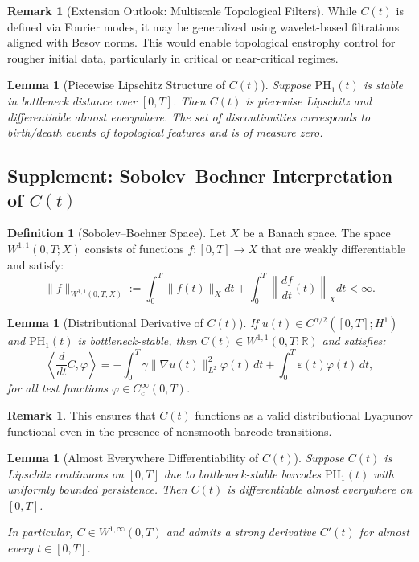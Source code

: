 \documentclass[11pt]{article}
\newtheorem{lemma}[theorem]{Lemma}
\theoremstyle{definition}
\newtheorem{definition}[theorem]{Definition}
\newtheorem{remark}[theorem]{Remark}
\begin{document}
\begin{remark}[Extension Outlook: Multiscale Topological Filters]
While $C(t)$ is defined via Fourier modes, it may be generalized using wavelet-based filtrations aligned with Besov norms. This would enable topological enstrophy control for rougher initial data, particularly in critical or near-critical regimes.
\end{remark}

\begin{lemma}[Piecewise Lipschitz Structure of $C(t)$]
Suppose $\mathrm{PH}_1(t)$ is stable in bottleneck distance over $[0,T]$. Then $C(t)$ is piecewise Lipschitz and differentiable almost everywhere. The set of discontinuities corresponds to birth/death events of topological features and is of measure zero.
\end{lemma}

\subsection*{Supplement: Sobolev--Bochner Interpretation of $C(t)$}

\begin{definition}[Sobolev--Bochner Space]
Let $X$ be a Banach space. The space $W^{1,1}(0,T; X)$ consists of functions $f: [0,T] \to X$ that are weakly differentiable and satisfy:
\[
\|f\|_{W^{1,1}(0,T; X)} := \int_0^T \|f(t)\|_X dt + \int_0^T \left\|\frac{df}{dt}(t)\right\|_X dt < \infty.
\]
\end{definition}

\begin{lemma}[Distributional Derivative of $C(t)$]
If $u(t) \in C^{\alpha/2}([0,T]; H^1)$ and $\mathrm{PH}_1(t)$ is bottleneck-stable, then $C(t) \in W^{1,1}(0,T; \mathbb{R})$ and satisfies:
\[
\left\langle \frac{d}{dt} C, \varphi \right\rangle = -\int_0^T \gamma \|\nabla u(t)\|_{L^2}^2 \varphi(t)\, dt + \int_0^T \varepsilon(t) \varphi(t)\, dt,
\]
for all test functions $\varphi \in C_c^\infty(0,T)$.
\end{lemma}

\begin{remark}
This ensures that $C(t)$ functions as a valid distributional Lyapunov functional even in the presence of nonsmooth barcode transitions.
\end{remark}

\begin{lemma}[Almost Everywhere Differentiability of $C(t)$]
\label{lem:Ct_rademacher}
Suppose $C(t)$ is Lipschitz continuous on $[0,T]$ due to bottleneck-stable barcodes $\mathrm{PH}_1(t)$ with uniformly bounded persistence. Then $C(t)$ is differentiable almost everywhere on $[0,T]$.

In particular, $C \in W^{1,\infty}(0,T)$ and admits a strong derivative $C'(t)$ for almost every $t \in [0,T]$.
\end{lemma}
\end{document}
